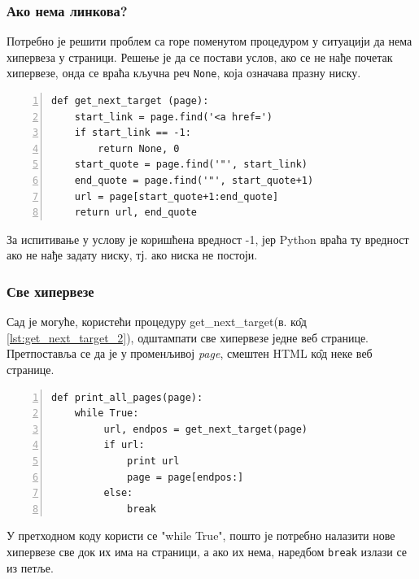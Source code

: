 		\subsubsection{Ако нема линкова?}
		Потребно је решити проблем са горе поменутом процедуром у ситуацији да нема хипервеза у страници. Решење је да се постави услов, ако се не нађе почетак хипервезе, онда се враћа кључна реч \lstinline{None}, која означава празну ниску.
		\begin{lstlisting}[caption = Испитивање да ли страница садржи хипервезу, label={lst:get_next_target_2}, numbers = left]
def get_next_target (page):
    start_link = page.find('<a href=')
    if start_link == -1:
        return None, 0
    start_quote = page.find('"', start_link)
    end_quote = page.find('"', start_quote+1)
    url = page[start_quote+1:end_quote]
    return url, end_quote
		\end{lstlisting}
		За испитивање у услову је коришћена вредност -1, јер Python враћа ту вредност ако не нађе задату ниску, тј. ако ниска не постоји.
		\subsubsection{Све хипервезе}
		Сад је могуће, користећи процедуру get\_next\_target(в. к\^{о}д \ref{lst:get_next_target_2}), одштампати све хипервезе једне веб странице. Претпоставља се да је у променљивој \emph{page}, смештен HTML к\^{о}д неке веб странице.
		\begin{lstlisting}[caption=Процедура штампања свих хипервеза, label={lst:print_all_links}, numbers = left	]
def print_all_pages(page):
    while True:
         url, endpos = get_next_target(page)
         if url:
             print url
             page = page[endpos:]
         else:
             break
		\end{lstlisting}
        У претходном коду користи се "while True", пошто је потребно налазити нове хипервезе све док их има на страници, а ако их нема, наредбом \lstinline{break} излази се из петље.
